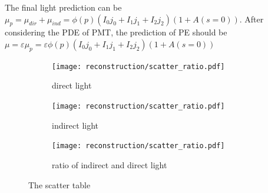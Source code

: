 The final light prediction can be $\mu_p=\mu_{dir}+\mu_{ind}=\phi(p)(I_0j_0+I_1j_1+I_2j_2)(1+A(s=0))$. After considering the PDE of PMT, the prediction of PE should be $\mu=\varepsilon\mu_p=\varepsilon\phi(p)(I_0j_0+I_1j_1+I_2j_2)(1+A(s=0))$
\begin{figure}[h]
	\centering
	\begin{subfigure}{0.5\textwidth}
		\centering
		\texttt{[image: reconstruction/scatter\_ratio.pdf]}
		\caption{direct light}
		\label{fig:dir}
	\end{subfigure}%
	\hfill
	\begin{subfigure}{0.5\textwidth}
		\centering
		\texttt{[image: reconstruction/scatter\_ratio.pdf]}
		\caption{indirect light}
		\label{fig:ind}
	\end{subfigure}%
	\hfill
	\begin{subfigure}{0.5\textwidth}
		\centering
		\texttt{[image: reconstruction/scatter\_ratio.pdf]}
		\caption{ratio of indirect and direct light}
		\label{fig:ratio}
	\end{subfigure}
	\caption{The scatter table}
	\label{fig:scatterTable}
\end{figure}

